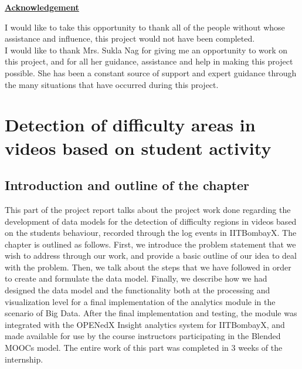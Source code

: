 \documentclass[16pt]{report}
\begin{document}

\begin{center}
\LARGE
\textbf{\underline{Acknowledgement}}
\end{center}
\vspace{50pt}


I would like to take this opportunity to thank all of the people without whose assistance and influence, this project would not have been completed.\\

I would like to thank Mrs. Sukla Nag for giving me an opportunity to work on this project, and for all her guidance, assistance and help in making this project possible. She has been a constant source of support and expert guidance through the many situations that have occurred during this project.


\vfill


\pagebreak

\tableofcontents

\pagebreak


\setcounter{page}{1}

\chapter{Detection of difficulty areas in videos based on student activity}

\section{Introduction and outline of the chapter}

This part of the project report talks about the project work done regarding the development of data models for the detection of difficulty regions in videos based on the students behaviour, recorded through the log events in IITBombayX. The chapter is outlined as follows. First, we introduce the problem statement that we wish to address through our work, and provide a basic outline of our idea to deal with the problem. Then, we talk about the steps that we have followed in order to create and formulate the data model. Finally, we describe how we had designed the data model and the functionality both at the processing and visualization level for a final implementation of the analytics module in the scenario of Big Data. After the final implementation and testing, the module was integrated with the OPENedX Insight analytics system for IITBombayX, and made available for use by the course instructors participating in the Blended MOOCs model. The entire work of this part was completed in 3 weeks of the internship.
\end{document}
